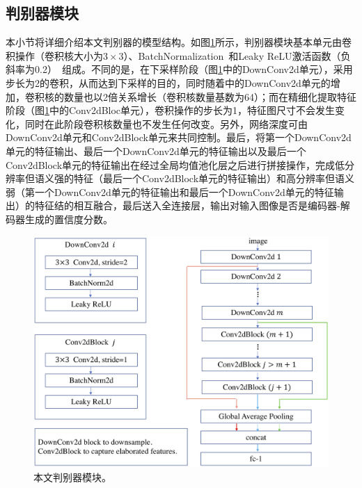 \subsection{判别器模块}\label{subsec:discrimintor_model}
本小节将详细介绍本文判别器的模型结构。如图\ref{fig:discrimintor_architecture}所示，判别器模块基本单元由卷积操作（卷积核大小为$3\times 3$）、BatchNormalization~\cite{ioffe2015batch}和Leaky ReLU激活函数（负斜率为0.2）~\cite{maas2013rectifier}组成。不同的是，在下采样阶段（图\ref{fig:discrimintor_architecture}中的DownConv2d单元），采用步长为2的卷积，从而达到下采样的目的，同时随着中的DownConv2d单元的增加，卷积核的数量也以2倍关系增长（卷积核数量基数为64）；而在精细化提取特征阶段（图\ref{fig:discrimintor_architecture}中的Conv2dBloc单元），卷积操作的步长为1，特征图尺寸不会发生变化，同时在此阶段卷积核数量也不发生任何改变。另外，网络深度可由DownConv2d单元和Conv2dBlock单元来共同控制。最后，将第一个DownConv2d单元的特征输出、最后一个DownConv2d单元的特征输出以及最后一个Conv2dBlock单元的特征输出在经过全局均值池化层之后进行拼接操作，完成低分辨率但语义强的特征（最后一个Conv2dBlock单元的特征输出）和高分辨率但语义弱（第一个DownConv2d单元的特征输出和最后一个DownConv2d单元的特征输出）的特征结的相互融合，最后送入全连接层，输出对输入图像是否是编码器-解码器生成的置信度分数。

\begin{figure}[h]
	\centering
	\includegraphics[width=1.0\textwidth]{figure/discrimintor_architecture.png}
	\caption[本文判别器模块]{本文判别器模块。}
	\label{fig:discrimintor_architecture}
\end{figure}

